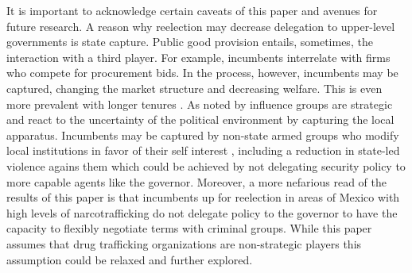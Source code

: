 \documentclass[12pt]{amsart}
\numberwithin{equation}{section}
\theoremstyle{definition}
\theoremstyle{definition}
\theoremstyle{definition}
\begin{document}
It is important to acknowledge certain caveats of this paper and avenues for future research. A reason why reelection may decrease delegation to upper-level governments is state capture. Public good provision entails, sometimes, the interaction with a third player. For example, incumbents interrelate with firms who compete for procurement bids. In the process, however, incumbents may be captured, changing the market structure and decreasing welfare. This is even more prevalent with longer tenures \citep{coviello_etal_2017}. As noted by  \citet{canen_etal_2020} influence groups are strategic and react to the uncertainty of the political environment by capturing the local apparatus. Incumbents may be captured by non-state armed groups who modify local institutions in favor of their self interest \citep{ch_etal_2018}, including a reduction in state-led violence agains them which could be achieved by not delegating security policy to more capable agents like the governor.  Moreover, a more nefarious read of the results of this paper is that incumbents up for reelection in areas of Mexico with high levels of narcotrafficking do not delegate policy to the governor to have the capacity to flexibly negotiate terms with criminal groups. While this paper assumes that drug trafficking organizations are non-strategic players this assumption could be relaxed and further explored. 
           


\clearpage
   
 
      
\end{document}
